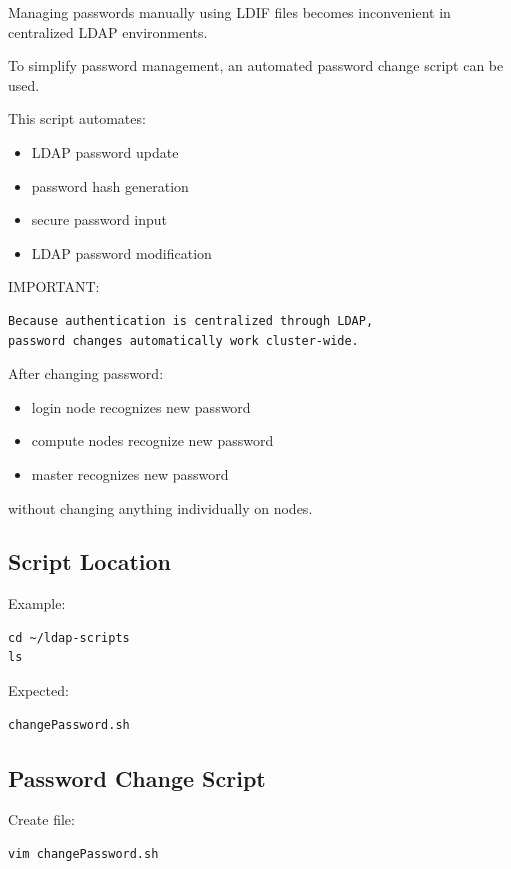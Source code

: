 \documentclass[11pt]{article}
\begin{document}
Managing passwords manually using LDIF files becomes inconvenient
in centralized LDAP environments.

To simplify password management, an automated password change script
can be used.

This script automates:

\begin{itemize}
\item LDAP password update
\item password hash generation
\item secure password input
\item LDAP password modification
\end{itemize}

IMPORTANT:

\begin{verbatim}
Because authentication is centralized through LDAP,
password changes automatically work cluster-wide.
\end{verbatim}

After changing password:

\begin{itemize}
\item login node recognizes new password
\item compute nodes recognize new password
\item master recognizes new password
\end{itemize}

without changing anything individually on nodes.
\subsection{Script Location}
\label{sec:org656ef66}

Example:

\begin{verbatim}
cd ~/ldap-scripts
ls
\end{verbatim}

Expected:

\begin{verbatim}
changePassword.sh
\end{verbatim}
\subsection{Password Change Script}
\label{sec:org8268eeb}

Create file:

\begin{verbatim}
vim changePassword.sh
\end{verbatim}
\end{document}
